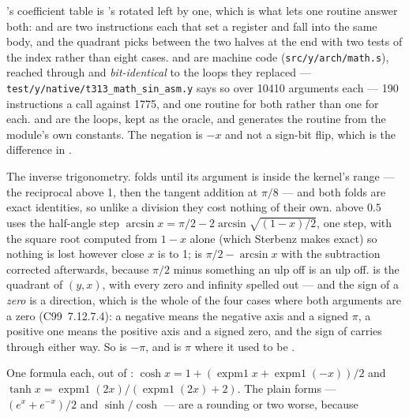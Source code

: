 \begin{description}[style=nextline,leftmargin=5.2em]
    's coefficient table is 's rotated left by one, which is what
    lets one routine answer both:  and  are two instructions
    each that set a register and fall into the same body, and the quadrant picks
    between the two halves at the end with two tests of the index rather than
    eight cases.  and  are machine code
    (\texttt{src/y/arch/math.s}), reached through  and
    \emph{bit-identical} to the loops they replaced ---
    \texttt{test/y/native/t313\_math\_sin\_asm.y} says so over \num{10410}
    arguments each --- \num{190} instructions a call against \num{1775}, and one
    routine for both rather than one for each.  and  are
    the loops, kept as the oracle, and  generates
    the routine from the module's own constants. The negation is
     $- x$ and not a sign-bit flip, which is the difference in
    .
  \item[\ic{math.asin(x)}, \ic{math.acos(x)}, \ic{math.atan(x)},
    \ic{math.atan2(y, x)}] The inverse trigonometry.  folds until its
    argument is inside the kernel's range --- the reciprocal above 1, then the
    tangent addition at $\pi/8$ --- and both folds are exact identities, so unlike
    a division they cost nothing of their own.  above $0.5$ uses the
    half-angle step $\arcsin x = \pi/2 - 2\arcsin\sqrt{(1-x)/2}$, one step, with the
    square root computed from $1-x$ alone (which Sterbenz makes exact) so nothing
    is lost however close $x$ is to 1;  is $\pi/2 - \arcsin x$ with the
    subtraction corrected afterwards, because $\pi/2$ minus something an ulp off
    is an ulp off.  is the quadrant of $(y,x)$, with every zero and
    infinity spelled out --- and the sign of a \emph{zero} is a direction, which
    is the whole of the four cases where both arguments are a zero
    (C99~7.12.7.4): a negative  means the negative axis and a signed
    $\pi$, a positive one means the positive axis and a signed zero, and the
    sign of  carries through either way. So 
    is $-\pi$, and  is $\pi$ where it used to be
    .
  \item[\ic{math.sinh(x)}, \ic{math.cosh(x)}, \ic{math.tanh(x)}] One formula
    each, out of :
    $\cosh x = 1 + (\operatorname{expm1} x + \operatorname{expm1}(-x))/2$ and
    $\tanh x = \operatorname{expm1}(2x)/(\operatorname{expm1}(2x) + 2)$. The plain forms ---
    $(e^x+e^{-x})/2$ and $\sinh/\cosh$ --- are a rounding or two worse, because

\end{description}
